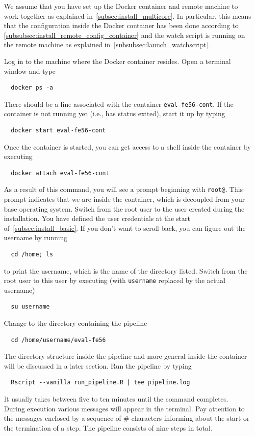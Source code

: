 \documentclass[12pt,a4paper]{scrartcl}
\begin{document}
We assume that you have set up the Docker container and remote machine to work together as explained in~\cref{subsec:install_multicore}.
In particular, this means that the configuration inside the Docker container has been done according to \cref{subsubsec:install_remote_config_container} and the watch script is running on the remote machine as explained in~\cref{subsubsec:launch_watchscript}.

Log in to the machine where the Docker container resides.
Open a terminal window and type
\begin{verbatim}
  docker ps -a
\end{verbatim}
There should be a line associated with the container \verb|eval-fe56-cont|.
If the container is not running yet (i.e., has status exited), start it up by typing
\begin{verbatim}
  docker start eval-fe56-cont
\end{verbatim}
Once the container is started, you can get access to a shell inside the container by executing
\begin{verbatim}
  docker attach eval-fe56-cont
\end{verbatim}
As a result of this command, you will see a prompt beginning with \verb|root@|.
This prompt indicates that we are inside the container, which is decoupled from your base operating system.
Switch from the root user to the user created during the installation.
You have defined the user credentials at the start of~\cref{subsec:install_basic}.
If you don't want to scroll back, you can figure out the username by  running
\begin{verbatim}
  cd /home; ls
\end{verbatim}
to print the username, which is the name of the directory listed.
Switch from the root user to this user by executing (with \verb|username| replaced by the actual username)
\begin{verbatim}
  su username
\end{verbatim}
 Change to the directory containing the pipeline
\begin{verbatim}
  cd /home/username/eval-fe56
\end{verbatim}
  The directory structure inside the pipeline and more general inside the container will be discussed in a later section.
  Run the pipeline by typing
\begin{verbatim}
  Rscript --vanilla run_pipeline.R | tee pipeline.log
\end{verbatim}
It usually takes between five to ten minutes until the command completes.
During execution various messages will appear in the terminal.
Pay attention to the messages enclosed by a sequence of \# characters informing about the start or the termination of a step.
The pipeline consists of nine steps in total.
\end{document}
